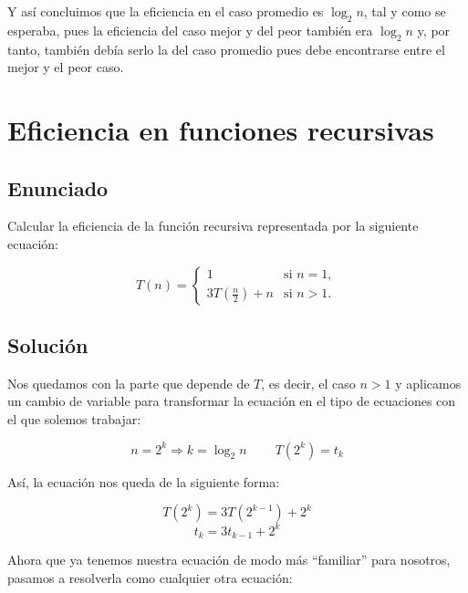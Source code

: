 \documentclass[10pt,a4paper,spanish]{report}
\begin{document}
Y así concluimos que la eficiencia en el caso promedio es $\log_2 n$, tal y como se esperaba, pues la eficiencia del caso mejor y del peor también era $\log_2 n$ y, por tanto, también debía serlo la del caso promedio pues debe encontrarse entre el mejor y el peor caso.

\chapter{\textcolor[rgb]{0.9,0.3,0.35}Eficiencia en funciones recursivas}
\section{\textcolor[rgb]{0.9,0.3,0.35}Enunciado}
{\Large Calcular la eficiencia de la función recursiva representada por la siguiente ecuación:

\begin{equation*}
T(n) = \left\{
\begin{array}{rl}
1 & \text{si } n = 1,\\
3T(\frac{n}{2}) + n & \text{si } n > 1.
\end{array} \right.
\end{equation*}
}

\section{\textcolor[rgb]{0.2,0.55,1}Solución}
Nos quedamos con la parte que depende de $T$, es decir, el caso $n > 1$ y aplicamos un cambio de variable para transformar la ecuación en el tipo de ecuaciones con el que solemos trabajar:

\begin{displaymath}
n = 2^k \Longrightarrow k = \log_2 n \qquad\ T(2^k) = t_k
\end{displaymath}

Así, la ecuación nos queda de la siguiente forma:

\begin{displaymath}
T(2^k) = 3T(2^{k-1}) + 2^k
\end{displaymath}
\begin{displaymath}
t_k = 3t_{k-1} + 2^k
\end{displaymath}

Ahora que ya tenemos nuestra ecuación de modo más ``familiar'' para nosotros, pasamos a resolverla como cualquier otra ecuación:
\end{document}
